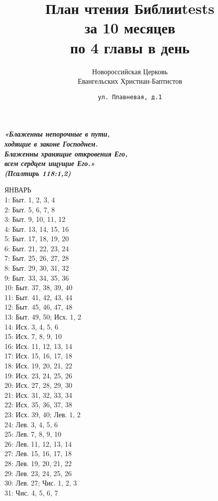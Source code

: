 \documentclass[fontsize=16pt,letterpaper,DIV=6]{scrartcl}
\title{План чтения Библииtests \\за 10 месяцев \\по 4 главы в день}
\author{Новороссийская Церковь\\Евангельских Христиан-Баптистов}
\date{\texttt{ул. Плавневая, д.1}}
\begin{document}
\maketitle
\setcounter{page}{0}
\thispagestyle{empty}
\clearpage
{}
{\centering\Large\itshape\bfseries «Блаженны непорочные в пути,\\ ходящие в законе Господнем.\\
Блаженны хранящие откровения Его,\\ всем сердцем ищущие Его.»\\
(Псалтирь 118:1,2)
\par}
\clearpage
\begin{multicols}{2}
ЯНВАРЬ
\\  1: Быт. 1, 2, 3, 4
\\  2: Быт. 5, 6, 7, 8
\\  3: Быт. 9, 10, 11, 12
\\  4: Быт. 13, 14, 15, 16
\\  5: Быт. 17, 18, 19, 20
\\  6: Быт. 21, 22, 23, 24
\\  7: Быт. 25, 26, 27, 28
\\  8: Быт. 29, 30, 31, 32
\\  9: Быт. 33, 34, 35, 36
\\  10: Быт. 37, 38, 39, 40
\\  11: Быт. 41, 42, 43, 44
\\  12: Быт. 45, 46, 47, 48
\\  13: Быт. 49, 50; Исх. 1, 2
\\  14: Исх. 3, 4, 5, 6
\\  15: Исх. 7, 8, 9, 10
\\  16: Исх. 11, 12, 13, 14
\\  17: Исх. 15, 16, 17, 18
\\  18: Исх. 19, 20, 21, 22
\\  19: Исх. 23, 24, 25, 26
\\  20: Исх. 27, 28, 29, 30
\\  21: Исх. 31, 32, 33, 34
\\  22: Исх. 35, 36, 37, 38
\\  23: Исх. 39, 40; Лев. 1, 2
\\  24: Лев. 3, 4, 5, 6
\\  25: Лев. 7, 8, 9, 10
\\  26: Лев. 11, 12, 13, 14
\\  27: Лев. 15, 16, 17, 18
\\  28: Лев. 19, 20, 21, 22
\\  29: Лев. 23, 24, 25, 26
\\  30: Лев. 27; Чис. 1, 2, 3
\\  31: Чис. 4, 5, 6, 7


\end{multicols}
\end{document}
